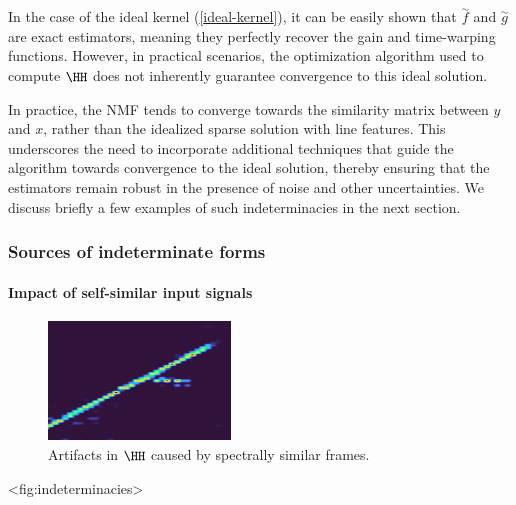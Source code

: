 In the case of the ideal kernel
(\hyperref[ideal-kernel]{{[}ideal-kernel{]}}), it can be easily shown
that \(\overset{\sim}{f}\) and \(\overset{\sim}{g}\) are exact
estimators, meaning they perfectly recover the gain and time-warping
functions. However, in practical scenarios, the optimization algorithm
used to compute \(\HH\) does not inherently guarantee convergence
to this ideal solution.

In practice, the NMF tends to converge towards the similarity matrix
between \(y\) and \(x\), rather than the idealized sparse solution with
line features. This underscores the need to incorporate additional
techniques that guide the algorithm towards convergence to the ideal
solution, thereby ensuring that the estimators remain robust in the
presence of noise and other uncertainties. We discuss briefly a few
examples of such indeterminacies in the next section.

\subsubsection{Sources of indeterminate forms}

\paragraph{Impact of self-similar input signals}

\begin{figure}
\centering
\includegraphics{../2024-05-30/longue-note.png}
\caption{Artifacts in \(\HH\) caused by spectrally similar
frames.}
\end{figure}

\textless fig:indeterminacies\textgreater{}

